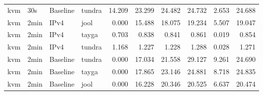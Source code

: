 \begin{table}[htbp]
\begin{tabular}{|l|l|l|l|r|r|r|r|r|r|}
kvm & 30s & Baseline & tundra & 14.209 & 23.299 & 24.482 & 24.732 & 2.653 & 24.688 \\
kvm & 2min & IPv4 & jool & 0.000 & 15.488 & 18.075 & 19.234 & 5.507 & 19.047 \\
kvm & 2min & IPv4 & tayga & 0.703 & 0.838 & 0.841 & 0.861 & 0.019 & 0.854 \\
kvm & 2min & IPv4 & tundra & 1.168 & 1.227 & 1.228 & 1.288 & 0.028 & 1.271 \\
kvm & 2min & Baseline & tundra & 0.000 & 17.034 & 21.558 & 29.127 & 9.261 & 24.690 \\
kvm & 2min & Baseline & tayga & 0.000 & 17.865 & 23.146 & 24.881 & 8.718 & 24.835 \\
kvm & 2min & Baseline & jool & 0.000 & 16.228 & 20.346 & 20.525 & 6.637 & 20.474 \\
\hline
\end{tabular}
\end{table}


